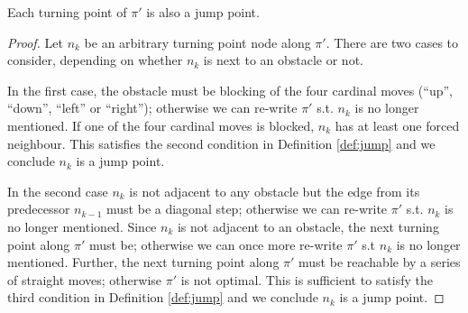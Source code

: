 \begin{corollary}
\label{lemma:turningpoints}
Each turning point of $\pi'$ is also a jump point.
\end{corollary}
\begin{proof}
Let $n_{k}$ be an arbitrary turning point node along $\pi'$. 
There are two cases to consider, depending on whether $n_{k}$ is next
to an obstacle or not.
\par
In the first case, the obstacle must be blocking of the four cardinal 
moves (``up'', ``down'', ``left'' or ``right''); otherwise we can re-write 
$\pi'$ s.t. $n_{k}$ is no longer mentioned.
If one of the four cardinal moves is blocked, $n_{k}$ has at least one
forced neighbour. This satisfies the second condition in Definition
\ref{def:jump} and we conclude $n_{k}$ is a jump point.
\par
In the second case $n_{k}$ is not adjacent to any obstacle but the edge
from its predecessor $n_{k-1}$ must be a diagonal step; otherwise we can 
re-write $\pi'$ s.t. $n_{k}$ is no longer mentioned.
Since $n_{k}$ is not adjacent to an obstacle, the next turning point along 
$\pi'$ must be; otherwise we can once more re-write $\pi'$ s.t $n_{k}$ is no longer
mentioned. Further, the next turning point along $\pi'$ must be reachable 
by a series of straight moves; otherwise $\pi'$ is not optimal.
This is sufficient to satisfy the third condition in Definition \ref{def:jump} and
we conclude $n_{k}$ is a jump point.
\end{proof}

%
